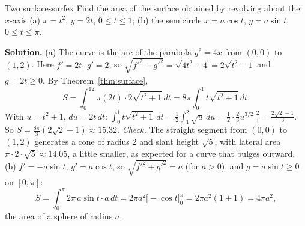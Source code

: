 \documentclass[11pt]{article}
\begin{document}
\begin{exmp}{Two surfaces}{surfex}
Find the area of the surface obtained by revolving about the $x$-axis (a) $x=t^2$, $y=2t$, $0\le t\le1$; (b) the semicircle $x=a\cos t$, $y=a\sin t$, $0\le t\le\pi$.

\textbf{Solution.} (a) The curve is the arc of the parabola $y^2=4x$ from $(0,0)$ to $(1,2)$. Here $f'=2t$, $g'=2$, so $\sqrt{f'^2+g'^2}=\sqrt{4t^2+4}=2\sqrt{t^2+1}$ and $g=2t\ge0$. By Theorem~\ref{thm:surface},
\[
S=\int_0^12\pi(2t)\cdot2\sqrt{t^2+1}\,dt=8\pi\int_0^1t\sqrt{t^2+1}\,dt.
\]
With $u=t^2+1$, $du=2t\,dt$: $\int_0^1t\sqrt{t^2+1}\,dt=\frac12\int_1^2\sqrt u\,du=\frac12\cdot\frac23u^{3/2}\Big|_1^2=\frac{2\sqrt2-1}3$. So $S=\frac{8\pi}3\left(2\sqrt2-1\right)\approx15.32$.
\emph{Check.} The straight segment from $(0,0)$ to $(1,2)$ generates a cone of radius $2$ and slant height $\sqrt5$, with lateral area $\pi\cdot2\cdot\sqrt5\approx14.05$, a little smaller, as expected for a curve that bulges outward.
(b) $f'=-a\sin t$, $g'=a\cos t$, so $\sqrt{f'^2+g'^2}=a$ (for $a>0$), and $g=a\sin t\ge0$ on $[0,\pi]$:
\[
S=\int_0^\pi2\pi\,a\sin t\cdot a\,dt=2\pi a^2\bigl[-\cos t\bigr]_0^\pi=2\pi a^2(1+1)=4\pi a^2,
\]
the area of a sphere of radius $a$.
\end{exmp}

\begin{center}
\end{center}
\end{document}
